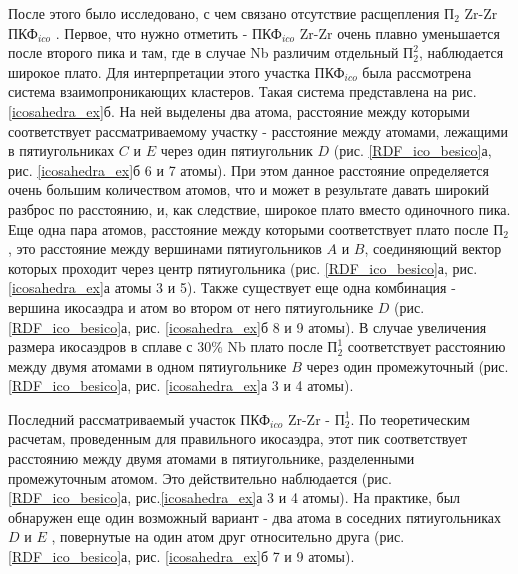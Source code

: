 После этого было исследовано, с чем связано отсутствие расщепления $\text{П}_2$ Zr-Zr  $\text{ПКФ}_{ico}$ .  Первое, что нужно отметить - $\text{ПКФ}_{ico}$ Zr-Zr очень  плавно уменьшается после второго пика и там, где в случае Nb различим отдельный $\text{П}_2^2$, наблюдается широкое плато. Для интерпретации этого участка $\text{ПКФ}_{ico}$ была рассмотрена система взаимопроникающих кластеров. Такая система представлена на рис. \ref{icosahedra_ex}б. На ней выделены два атома, расстояние между которыми соответствует рассматриваемому участку -  расстояние между атомами, лежащими в пятиугольниках $C$ и $E$ через один пятиугольник $D$ (рис. \ref{RDF_ico_besico}а, рис. \ref{icosahedra_ex}б 6 и 7 атомы). При этом данное расстояние определяется очень большим количеством атомов, что и может в результате давать широкий разброс по расстоянию, и, как следствие, широкое плато вместо одиночного пика. Еще одна пара атомов, расстояние между которыми соответствует плато после $\text{П}_2$, это расстояние между вершинами пятиугольников $A$ и $B$, соединяющий вектор которых проходит через центр пятиугольника (рис. \ref{RDF_ico_besico}а, рис. \ref{icosahedra_ex}а атомы 3 и 5). Также существует еще одна комбинация - вершина икосаэдра и атом во втором от него пятиугольнике $D$ (рис. \ref{RDF_ico_besico}а, рис. \ref{icosahedra_ex}б 8 и 9 атомы). В случае увеличения размера икосаэдров в сплаве с 30\% Nb плато после $\text{П}_2^1$ соответствует расстоянию между двумя атомами в  одном пятиугольнике $B$ через один промежуточный (рис.\ref{RDF_ico_besico}а, рис. \ref{icosahedra_ex}а 3 и 4 атомы).  

Последний рассматриваемый участок $\text{ПКФ}_{ico}$ Zr-Zr - $\text{П}_2^1$. По теоретическим расчетам, проведенным для правильного икосаэдра, этот пик соответствует расстоянию между двумя атомами в пятиугольнике, разделенными промежуточным атомом. Это действительно наблюдается  (рис.\ref{RDF_ico_besico}а, рис.\ref{icosahedra_ex}а 3 и 4 атомы). На практике, был обнаружен еще один возможный вариант - два атома в соседних пятиугольниках $D$ и $E$ , повернутые на один атом друг относительно друга (рис.\ref{RDF_ico_besico}а, рис. \ref{icosahedra_ex}б 7 и 9 атомы).

